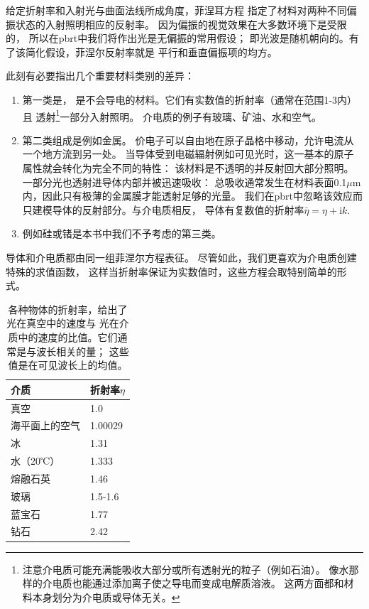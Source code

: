 给定折射率和入射光与曲面法线所成角度，菲涅耳方程
指定了材料对两种不同偏振状态的入射照明相应的反射率。
因为偏振的视觉效果在大多数环境下是受限的，
所以在pbrt中我们将作出光是无偏振的常用假设；
即光波是随机朝向的。有了该简化假设，菲涅尔反射率就是
平行和垂直偏振项的均方。

此刻有必要指出几个重要材料类别的差异：
\begin{enumerate}
    \item 第一类是，
          是不会导电的材料。它们有实数值的折射率（通常在范围1-3内）且
          透射\footnote{注意介电质可能充满能吸收大部分或所有透射光的粒子（例如石油）。
              像水那样的介电质也能通过添加离子使之导电而变成电解质溶液。
              这两方面都和材料本身划分为介电质或导体无关。}一部分入射照明。
          介电质的例子有玻璃、矿油、水和空气。
    \item 第二类组成是例如金属。
          价电子可以自由地在原子晶格中移动，允许电流从一个地方流到另一处。
          当导体受到电磁辐射例如可见光时，这一基本的原子属性就会转化为完全不同的特性：
          该材料是不透明的并反射回大部分照明。一部分光也透射进导体内部并被迅速吸收：
          总吸收通常发生在材料表面0.1$\mu\mathrm{m}$内，因此只有极薄的金属膜才能透射足够的光量。
          我们在pbrt中忽略该效应而只建模导体的反射部分。与介电质相反，
          导体有复数值的折射率$\bar{\eta}=\eta+\mathrm{i}k$.
    \item {}例如硅或锗是本书中我们不予考虑的第三类。
\end{enumerate}

导体和介电质都由同一组菲涅尔方程表征。
尽管如此，我们更喜欢为介电质创建特殊的求值函数，
这样当折射率保证为实数值时，这些方程会取特别简单的形式。

\begin{table}[htbp]
    \centering
    \begin{tabular}{ll}
        \toprule
        \textbf{介质}  & \textbf{折射率}$\eta$ \\
        \midrule
        真空           & 1.0                   \\
        海平面上的空气 & 1.00029               \\
        冰             & 1.31                  \\
        水（20℃）      & 1.333                 \\
        熔融石英       & 1.46                  \\
        玻璃           & 1.5-1.6               \\
        蓝宝石         & 1.77                  \\
        钻石           & 2.42                  \\
        \bottomrule
    \end{tabular}
    \caption{各种物体的折射率，给出了光在真空中的速度与
        光在介质中的速度的比值。它们通常是与波长相关的量；
        这些值是在可见波长上的均值。}
    \label{tab:8.1}
\end{table}

